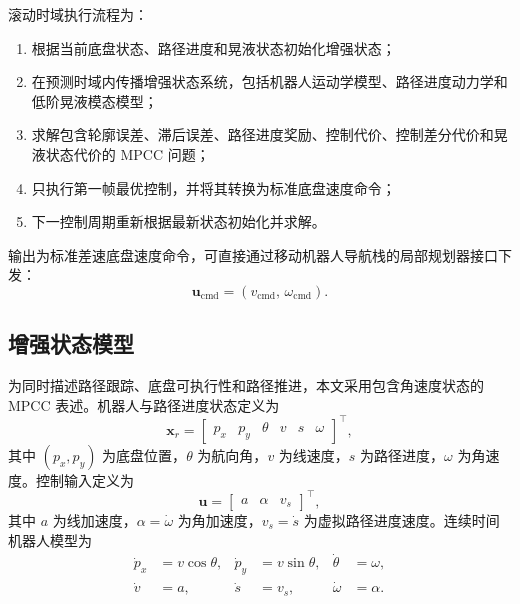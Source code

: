 \documentclass[12pt,a4paper]{ctexart}
\newcommand{\MPCC}{MPCC}
\newcommand{\xr}{\bm{x}_{r}}
\newcommand{\vu}{\bm{u}}
\begin{document}
滚动时域执行流程为：
\begin{enumerate}
  \item 根据当前底盘状态、路径进度和晃液状态初始化增强状态；
  \item 在预测时域内传播增强状态系统，包括机器人运动学模型、路径进度动力学和低阶晃液模态模型；
  \item 求解包含轮廓误差、滞后误差、路径进度奖励、控制代价、控制差分代价和晃液状态代价的 \MPCC{} 问题；
  \item 只执行第一帧最优控制，并将其转换为标准底盘速度命令；
  \item 下一控制周期重新根据最新状态初始化并求解。
\end{enumerate}

输出为标准差速底盘速度命令，可直接通过移动机器人导航栈的局部规划器接口下发：
\begin{equation}
  \bm{u}_{\mathrm{cmd}} = (v_{\mathrm{cmd}},\,\omega_{\mathrm{cmd}}).
\end{equation}

\subsection{增强状态模型}
\label{subsec:augmented-state-model}

为同时描述路径跟踪、底盘可执行性和路径推进，本文采用包含角速度状态的 \MPCC{} 表述。机器人与路径进度状态定义为
\begin{equation}
  \xr =
  \begin{bmatrix}
    p_x & p_y & \theta & v & s & \omega
  \end{bmatrix}^{\top},
\end{equation}
其中 $(p_x,p_y)$ 为底盘位置，$\theta$ 为航向角，$v$ 为线速度，$s$ 为路径进度，$\omega$ 为角速度。控制输入定义为
\begin{equation}
  \vu =
  \begin{bmatrix}
    a & \alpha & v_s
  \end{bmatrix}^{\top},
\end{equation}
其中 $a$ 为线加速度，$\alpha=\dot{\omega}$ 为角加速度，$v_s=\dot{s}$ 为虚拟路径进度速度。连续时间机器人模型为
\begin{equation}
\begin{aligned}
  \dot{p}_x &= v\cos\theta, &
  \dot{p}_y &= v\sin\theta, &
  \dot{\theta} &= \omega, \\
  \dot{v} &= a, &
  \dot{s} &= v_s, &
  \dot{\omega} &= \alpha .
\end{aligned}
\end{equation}
\end{document}
